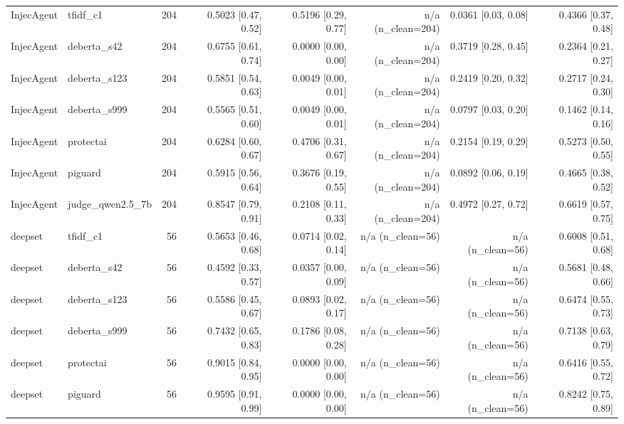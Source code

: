 \begin{tabular}{llrrrrrr}
InjecAgent & tfidf\_c1 & 204 & 0.5023 {\scriptsize[0.47, 0.52]} & 0.5196 {\scriptsize[0.29, 0.77]} & n/a (n\_clean=204) & 0.0361 {\scriptsize[0.03, 0.08]} & 0.4366 {\scriptsize[0.37, 0.48]} \\
InjecAgent & deberta\_s42 & 204 & 0.6755 {\scriptsize[0.61, 0.74]} & 0.0000 {\scriptsize[0.00, 0.00]} & n/a (n\_clean=204) & 0.3719 {\scriptsize[0.28, 0.45]} & 0.2364 {\scriptsize[0.21, 0.27]} \\
InjecAgent & deberta\_s123 & 204 & 0.5851 {\scriptsize[0.54, 0.63]} & 0.0049 {\scriptsize[0.00, 0.01]} & n/a (n\_clean=204) & 0.2419 {\scriptsize[0.20, 0.32]} & 0.2717 {\scriptsize[0.24, 0.30]} \\
InjecAgent & deberta\_s999 & 204 & 0.5565 {\scriptsize[0.51, 0.60]} & 0.0049 {\scriptsize[0.00, 0.01]} & n/a (n\_clean=204) & 0.0797 {\scriptsize[0.03, 0.20]} & 0.1462 {\scriptsize[0.14, 0.16]} \\
InjecAgent & protectai & 204 & 0.6284 {\scriptsize[0.60, 0.67]} & 0.4706 {\scriptsize[0.31, 0.67]} & n/a (n\_clean=204) & 0.2154 {\scriptsize[0.19, 0.29]} & 0.5273 {\scriptsize[0.50, 0.55]} \\
InjecAgent & piguard & 204 & 0.5915 {\scriptsize[0.56, 0.64]} & 0.3676 {\scriptsize[0.19, 0.55]} & n/a (n\_clean=204) & 0.0892 {\scriptsize[0.06, 0.19]} & 0.4665 {\scriptsize[0.38, 0.52]} \\
InjecAgent & judge\_qwen2.5\_7b & 204 & 0.8547 {\scriptsize[0.79, 0.91]} & 0.2108 {\scriptsize[0.11, 0.33]} & n/a (n\_clean=204) & 0.4972 {\scriptsize[0.27, 0.72]} & 0.6619 {\scriptsize[0.57, 0.75]} \\
deepset & tfidf\_c1 & 56 & 0.5653 {\scriptsize[0.46, 0.68]} & 0.0714 {\scriptsize[0.02, 0.14]} & n/a (n\_clean=56) & n/a (n\_clean=56) & 0.6008 {\scriptsize[0.51, 0.68]} \\
deepset & deberta\_s42 & 56 & 0.4592 {\scriptsize[0.33, 0.57]} & 0.0357 {\scriptsize[0.00, 0.09]} & n/a (n\_clean=56) & n/a (n\_clean=56) & 0.5681 {\scriptsize[0.48, 0.66]} \\
deepset & deberta\_s123 & 56 & 0.5586 {\scriptsize[0.45, 0.67]} & 0.0893 {\scriptsize[0.02, 0.17]} & n/a (n\_clean=56) & n/a (n\_clean=56) & 0.6474 {\scriptsize[0.55, 0.73]} \\
deepset & deberta\_s999 & 56 & 0.7432 {\scriptsize[0.65, 0.83]} & 0.1786 {\scriptsize[0.08, 0.28]} & n/a (n\_clean=56) & n/a (n\_clean=56) & 0.7138 {\scriptsize[0.63, 0.79]} \\
deepset & protectai & 56 & 0.9015 {\scriptsize[0.84, 0.95]} & 0.0000 {\scriptsize[0.00, 0.00]} & n/a (n\_clean=56) & n/a (n\_clean=56) & 0.6416 {\scriptsize[0.55, 0.72]} \\
deepset & piguard & 56 & 0.9595 {\scriptsize[0.91, 0.99]} & 0.0000 {\scriptsize[0.00, 0.00]} & n/a (n\_clean=56) & n/a (n\_clean=56) & 0.8242 {\scriptsize[0.75, 0.89]} \\
\bottomrule
\end{tabular}
